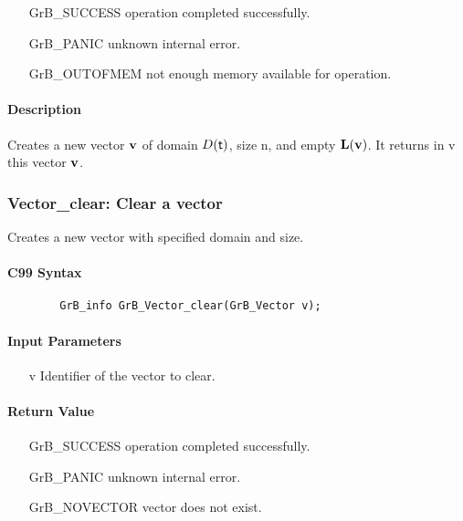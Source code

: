 \begin{itemize}[leftmargin=2.1in]
\item[{\sf GrB\_SUCCESS}]    operation completed successfully. \\
\item[{\sf GrB\_PANIC}]      unknown internal error. \\
\item[{\sf GrB\_OUTOFMEM}]   not enough memory available for operation. \\
\end{itemize}

\paragraph{Description}

Creates a new vector ${\bf v}$ of domain $D({\sf t})$, size {\sf n}, and
empty $\bold{L}({\bf v})$. It returns in {\sf v} this vector ${\bf v}$.

\subsubsection{{\sf Vector\_clear}: Clear a vector}

Creates a new vector with specified domain and size.

\paragraph{C99 Syntax}

\begin{verbatim}
        GrB_info GrB_Vector_clear(GrB_Vector v);
\end{verbatim}

\paragraph{Input Parameters}

\begin{itemize}[leftmargin=1.1in]
    \item[{\sf v}] Identifier of the vector to clear.
\end{itemize}

\paragraph{Return Value}

\begin{itemize}[leftmargin=2.1in]
\item[{\sf GrB\_SUCCESS}]   operation completed successfully.
\item[{\sf GrB\_PANIC}]     unknown internal error.
\item[{\sf GrB\_NOVECTOR}]  vector does not exist.
\end{itemize}

